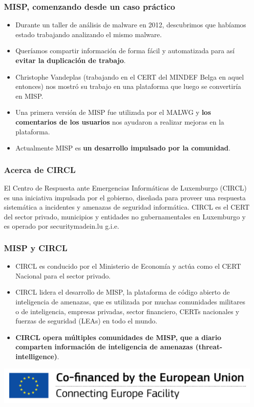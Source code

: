 
\begin{frame}[t,plain]
\titlepage
\end{frame}

\begin{frame}
 \frametitle{MISP, comenzando desde un caso práctico}
 \begin{itemize}
         \item Durante un taller de análisis de malware en 2012, descubrimos que habíamos estado trabajando analizando el mismo malware.
         \item Queríamos compartir información de forma fácil y automatizada para así {\bf evitar la duplicación de trabajo}.
         \item Christophe Vandeplas (trabajando en el CERT del MINDEF Belga en aquel entonces) nos mostró su trabajo en una plataforma que luego se convertiría en MISP.
         \item Una primera versión de MISP fue utilizada por el MALWG y {\bf los comentarios de los usuarios} nos ayudaron a realizar mejoras en la plataforma.
         \item Actualmente MISP es {\bf un desarrollo impulsado por la comunidad}.
 \end{itemize}
\end{frame}

\begin{frame}
\frametitle{Acerca de CIRCL}
El Centro de Respuesta ante Emergencias Informáticas de Luxemburgo (CIRCL) es una iniciativa impulsada por el gobierno, diseñada para proveer una respuesta sistemática a incidentes y amenazas de seguridad informática.
\linebreak
\linebreak
CIRCL es el CERT del sector privado, municipios y entidades no gubernamentales en Luxemburgo y es operado por securitymadein.lu g.i.e.
\end{frame}

\begin{frame}
\frametitle{MISP y CIRCL}
\begin{itemize}
\item CIRCL es conducido por el Ministerio de Economía y actúa como el CERT Nacional para el sector privado.
\item CIRCL lidera el desarrollo de MISP, la plataforma de código abierto de inteligencia de amenazas, que es utilizada por muchas comunidades militares o de inteligencia, empresas privadas, sector financiero, CERTs nacionales y fuerzas de seguridad (LEAs) en todo el mundo.
\item {\bf CIRCL opera múltiples comunidades de MISP, que a diario comparten información de inteligencia de amenazas (threat-intelligence)}.
\end{itemize}
        \includegraphics{en_cef.png}
\end{frame}

